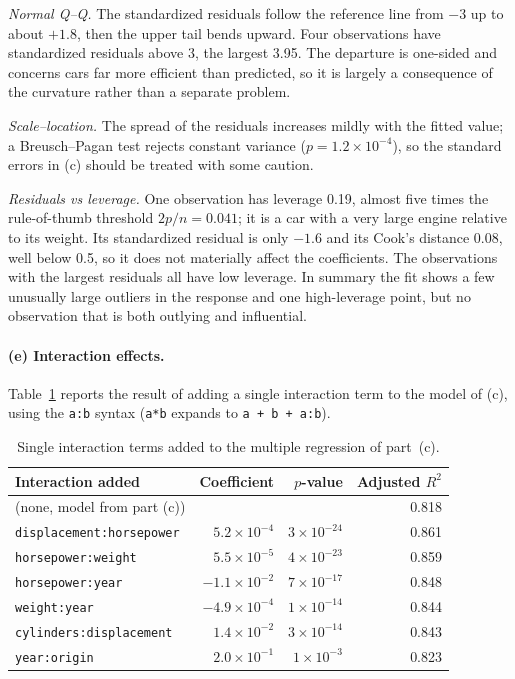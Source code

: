 \documentclass[11pt]{article}
\begin{document}
\emph{Normal Q--Q.} The standardized residuals follow the reference line from $-3$ up to about $+1.8$, then the upper tail bends upward. Four observations have standardized residuals above 3, the largest 3.95. The departure is one-sided and concerns cars far more efficient than predicted, so it is largely a consequence of the curvature rather than a separate problem.

\emph{Scale--location.} The spread of the residuals increases mildly with the fitted value; a Breusch--Pagan test rejects constant variance ($p = 1.2\times10^{-4}$), so the standard errors in (c) should be treated with some caution.

\emph{Residuals vs leverage.} One observation has leverage 0.19, almost five times the rule-of-thumb threshold $2p/n = 0.041$; it is a car with a very large engine relative to its weight. Its standardized residual is only $-1.6$ and its Cook's distance 0.08, well below 0.5, so it does not materially affect the coefficients. The observations with the largest residuals all have low leverage. In summary the fit shows a few unusually large outliers in the response and one high-leverage point, but no observation that is both outlying and influential.

\paragraph{(e) Interaction effects.}
Table~\ref{tab:interactions} reports the result of adding a single interaction term to the model of (c), using the \texttt{a:b} syntax (\texttt{a*b} expands to \texttt{a + b + a:b}).

\begin{table}[H]
  \centering
  \begin{tabular}{lrrr}
    \toprule
    Interaction added & Coefficient & $p$-value & Adjusted $R^2$ \\
    \midrule
    (none, model from part (c))      &                     &                    & 0.818 \\
    \texttt{displacement:horsepower} & $5.2\times10^{-4}$  & $3\times10^{-24}$  & 0.861 \\
    \texttt{horsepower:weight}       & $5.5\times10^{-5}$  & $4\times10^{-23}$  & 0.859 \\
    \texttt{horsepower:year}         & $-1.1\times10^{-2}$ & $7\times10^{-17}$  & 0.848 \\
    \texttt{weight:year}             & $-4.9\times10^{-4}$ & $1\times10^{-14}$  & 0.844 \\
    \texttt{cylinders:displacement}  & $1.4\times10^{-2}$  & $3\times10^{-14}$  & 0.843 \\
    \texttt{year:origin}             & $2.0\times10^{-1}$  & $1\times10^{-3}$   & 0.823 \\
    \bottomrule
  \end{tabular}
  \caption{Single interaction terms added to the multiple regression of part~(c).}
  \label{tab:interactions}
\end{table}
\end{document}
